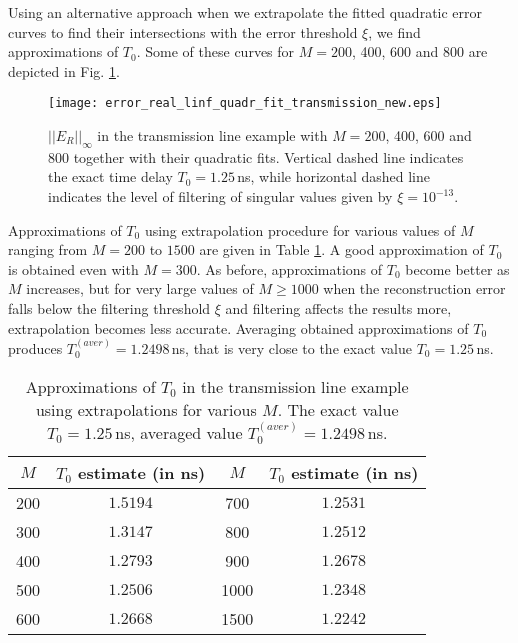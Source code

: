 \documentclass[journal,twoside]{IEEEtran}
\begin{document}
Using an alternative approach when we extrapolate the fitted quadratic error curves to find their intersections with the error threshold $\xi$, we find approximations of $T_0$. Some of these curves for $M=200$, 400, 600 and 800 are depicted in Fig. \ref{Ftransm_line_new3}.
\begin{figure}[h] \begin{center}
\texttt{[image: error\_real\_linf\_quadr\_fit\_transmission\_new.eps]}
\end{center}
\caption{$||E_R||_\infty$ in the transmission line example with $M=200$, 400, 600 and 800  together with their quadratic fits. Vertical dashed line indicates the exact time delay $T_0=1.25$\,ns, while horizontal dashed line indicates the level of filtering of singular values given by $\xi=10^{-13}$.} 
\label{Ftransm_line_new3}
\end{figure}
Approximations of $T_0$ using extrapolation procedure for various values of $M$ ranging from $M=200$ to $1500$ are given in Table \ref{Ftransm_line_new_table}. A good approximation of $T_0$ is obtained even with $M=300$. As before, approximations of $T_0$ become better as $M$ increases, but for very large values of $M\geq 1000$ when the reconstruction error falls below the filtering threshold $\xi$ and filtering affects the results more, extrapolation becomes less accurate. Averaging obtained approximations of $T_0$ produces $T_0^{(aver)}=1.2498$\,ns, that is very close to the exact value $T_0=1.25$\,ns.
\begin{table}[h]
\begin{center}
\begin{tabular}{|c|c||c|c|}
\hline
\rule{0cm}{10pt}
$M$ & $T_0$ estimate (in ns) & $M$ & $T_0$ estimate (in ns) \\[3pt]
\hline
\rule{0cm}{10pt}
  200 &     $1.5194$ & 700  & $1.2531$ \\[3pt]
\hline
\rule{0cm}{10pt}  
  300 &  $1.3147$  &   800  &  $1.2512$ \\[3pt]
\hline
\rule{0cm}{10pt}  
400  &  $1.2793$ & 900  & $1.2678$ \\[3pt] 
\hline
\rule{0cm}{10pt}    
500  &  $1.2506$ & 1000  &  $1.2348$ \\
\hline
\rule{0cm}{10pt}    
600  &  $1.2668$ & 1500  &  $1.2242$ \\
\hline
\end{tabular}
\end{center}
\caption{Approximations of $T_0$ in the transmission line example using extrapolations for various $M$. The exact value $T_0=1.25$\,ns, averaged value $T_0^{(aver)}=1.2498$\,ns.}
\label{Ftransm_line_new_table}
\end{table} 
\end{document}
